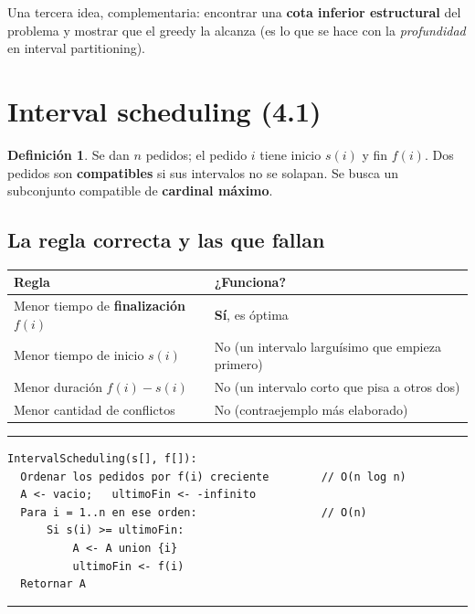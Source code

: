 \documentclass[11pt,a4paper]{article}
\theoremstyle{plain}
\theoremstyle{definition}
\newtheorem{definicion}[teorema]{Definición}
\theoremstyle{remark}
\newcommand{\codigoinicio}{\begin{center}\begin{minipage}{0.93\textwidth}%
  \hrule\vspace{3pt}}
\newcommand{\codigofin}{\vspace{-4pt}\hrule\end{minipage}\end{center}}
\begin{document}
\noindent Una tercera idea, complementaria: encontrar una \textbf{cota inferior
estructural} del problema y mostrar que el greedy la alcanza (es lo que se hace con la
\emph{profundidad} en interval partitioning).

\section{Interval scheduling (4.1)}

\begin{definicion}
Se dan $n$ pedidos; el pedido $i$ tiene inicio $s(i)$ y fin $f(i)$. Dos pedidos son
\textbf{compatibles} si sus intervalos no se solapan. Se busca un subconjunto
compatible de \textbf{cardinal máximo}.
\end{definicion}

\subsection{La regla correcta y las que fallan}

\begin{center}\small
\begin{tabular}{@{}ll@{}}
\toprule
\textbf{Regla} & \textbf{¿Funciona?} \\
\midrule
Menor tiempo de \textbf{finalización} $f(i)$ & \textbf{Sí}, es óptima \\
Menor tiempo de inicio $s(i)$ & No (un intervalo larguísimo que empieza primero) \\
Menor duración $f(i)-s(i)$ & No (un intervalo corto que pisa a otros dos) \\
Menor cantidad de conflictos & No (contraejemplo más elaborado) \\
\bottomrule
\end{tabular}
\end{center}

\codigoinicio
\begin{verbatim}
IntervalScheduling(s[], f[]):
  Ordenar los pedidos por f(i) creciente        // O(n log n)
  A <- vacio;   ultimoFin <- -infinito
  Para i = 1..n en ese orden:                   // O(n)
      Si s(i) >= ultimoFin:
          A <- A union {i}
          ultimoFin <- f(i)
  Retornar A
\end{verbatim}
\codigofin
\end{document}
